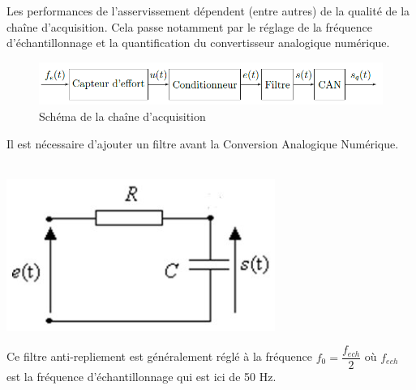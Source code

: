 Les performances de l'asservissement dépendent (entre autres) de la qualité de la chaîne d'acquisition. Cela passe notamment par le réglage de la fréquence d'échantillonnage et la quantification du convertisseur analogique numérique.

\begin{figure}[ht!]
\begin{center}
 \includegraphics[width=0.7\linewidth]{img/Figure16}
\end{center}
\caption{Schéma de la chaîne d'acquisition}
\label{fig16}
\end{figure}

Il est nécessaire d'ajouter un filtre avant la Conversion Analogique Numérique.
\\ ~\ \\
\begin{minipage}{0.35\linewidth}
 \includegraphics[width=0.9\linewidth]{img/Figure17}
\end{minipage}\hfill
\begin{minipage}{0.6\linewidth}
Ce filtre \og anti-repliement \fg est généralement réglé à la fréquence $f_0=\dfrac{f_{ech}}{2}$ où $f_{ech}$ est la fréquence d'échantillonnage qui est ici de 50 Hz.
\end{minipage}



